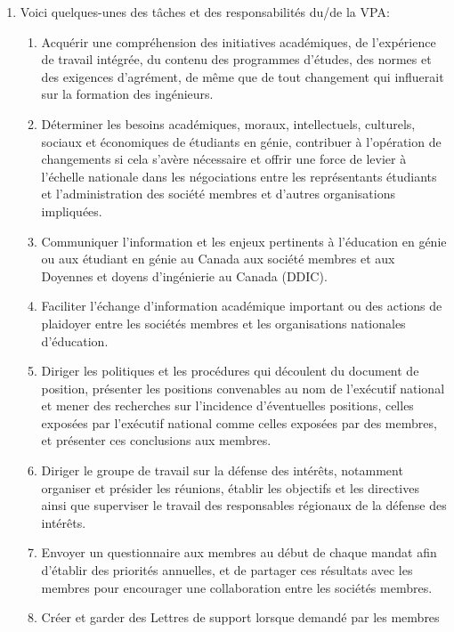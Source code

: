 \begin{enumerate}
 \item
  Voici quelques-unes des tâches et des responsabilités du/de la VPA:
  \begin{enumerate}
   \item
    Acquérir une compréhension des initiatives académiques, de l'expérience de travail intégrée, du contenu des programmes d'études, des normes et des exigences d'agrément, de même que de tout changement qui influerait sur la formation des ingénieurs.
   \item
    Déterminer les besoins académiques, moraux, intellectuels, culturels, sociaux et économiques de étudiants en génie, contribuer à l'opération de changements si cela s'avère nécessaire et offrir une force de levier à l'échelle nationale dans les négociations entre les représentants étudiants et l'administration des société membres et d'autres organisations impliquées.
   \item
    Communiquer l'information et les enjeux pertinents à l'éducation en génie ou aux étudiant en génie au Canada aux société membres et aux Doyennes et doyens d'ingénierie au Canada (DDIC).
   \item
    Faciliter l'échange d'information académique important ou des actions de plaidoyer entre les sociétés membres et les organisations nationales d'éducation.
   \item
    Diriger les politiques et les procédures qui découlent du document de position, présenter les positions convenables au nom de l'exécutif national et mener des recherches sur l'incidence d'éventuelles positions, celles exposées par l'exécutif national comme celles exposées par des membres, et présenter ces conclusions aux membres.
   \item
    Diriger le groupe de travail sur la défense des intérêts, notamment organiser et présider les réunions, établir les objectifs et les directives ainsi que superviser le travail des responsables régionaux de la défense des intérêts.
   \item
    Envoyer un questionnaire aux membres au début de chaque mandat afin d'établir des priorités annuelles, et de partager ces résultats avec les membres pour encourager une collaboration entre les sociétés membres.
   \item
    Créer et garder des Lettres de support lorsque demandé par les membres
  \end{enumerate}
\end{enumerate}

